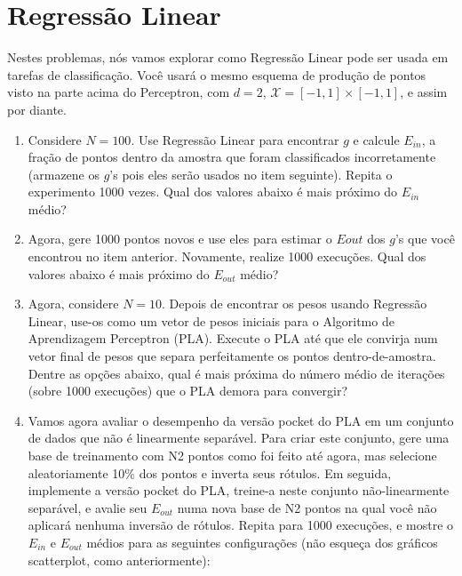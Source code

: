\section{Regressão Linear}

Nestes problemas, nós vamos explorar como Regressão Linear pode ser usada em tarefas de classificação.
Você usará o mesmo esquema de produção de pontos visto na parte acima do Perceptron, com $d = 2$,
$\mathcal{X} = [-1, 1] \times [-1, 1]$, e assim por diante.

\begin{enumerate}
    \item Considere $N = 100$. Use Regressão Linear para encontrar $g$ e calcule $E_{in}$, a fração de pontos dentro da amostra que foram classificados incorretamente (armazene os $g$'s pois eles serão usados no item seguinte). Repita o experimento 1000 vezes. Qual dos valores abaixo é mais próximo do $E_{in}$ médio?

    \item Agora, gere 1000 pontos novos e use eles para estimar o $Eout$ dos $g$'s que você encontrou no item anterior. Novamente, realize 1000 execuções. Qual dos valores abaixo é mais próximo do $E_{out}$ médio?

    \item Agora, considere $N = 10$. Depois de encontrar os pesos usando Regressão Linear, use-os como um vetor de pesos iniciais para o Algoritmo de Aprendizagem Perceptron (PLA). Execute o PLA até que ele convirja num vetor final de pesos que separa perfeitamente os pontos dentro-de-amostra. Dentre as opções abaixo, qual é mais próxima do número médio de iterações (sobre 1000 execuções) que o PLA demora para convergir?
    
    \item Vamos agora avaliar o desempenho da versão pocket do PLA em um conjunto de dados que não é linearmente separável. Para criar este conjunto, gere uma base de treinamento com N2 pontos como foi feito até agora, mas selecione aleatoriamente 10\% dos pontos e inverta seus rótulos. Em seguida, implemente a versão pocket do PLA, treine-a neste conjunto não-linearmente separável, e avalie seu $E_{out}$ numa nova base de N2 pontos na qual você não aplicará nenhuma inversão de rótulos. Repita para 1000 execuções, e mostre o $E_{in}$ e $E_{out}$ médios para as seguintes configurações (não esqueça dos gráficos scatterplot, como anteriormente):
\end{enumerate}